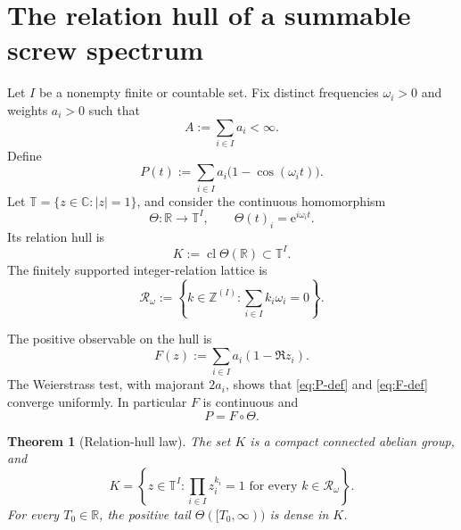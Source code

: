 \documentclass[11pt]{article}
\newtheorem{theorem}{Theorem}[section]
\theoremstyle{remark}
\newcommand{\T}{\mathbb T}
\newcommand{\R}{\mathbb R}
\newcommand{\Z}{\mathbb Z}
\newcommand{\e}{\mathrm e}
\newcommand{\cl}{\operatorname{cl}}
\newcommand{\Rel}{\mathcal R}
\begin{document}
\section{The relation hull of a summable screw spectrum}\label{sec:universal}

Let $I$ be a nonempty finite or countable set.  Fix distinct frequencies $\omega_i>0$ and weights
$a_i>0$ such that
\begin{equation}\label{eq:summable}
 A:=\sum_{i\in I}a_i<\infty.
\end{equation}
Define
\begin{equation}\label{eq:P-def}
 P(t):=\sum_{i\in I}a_i\bigl(1-\cos(\omega_i t)\bigr).
\end{equation}
Let $\T=\{z\in\mathbb C:|z|=1\}$, and consider the continuous homomorphism
\begin{equation}\label{eq:theta}
 \Theta:\R\longrightarrow\T^I,
 \qquad
 \Theta(t)_i=\e^{i\omega_i t}.
\end{equation}
Its relation hull is
\begin{equation}\label{eq:K-def}
 K:=\cl\Theta(\R)\subset\T^I.
\end{equation}
The finitely supported integer-relation lattice is
\begin{equation}\label{eq:relation-lattice}
 \Rel_\omega:=
 \left\{k\in\Z^{(I)}:\sum_{i\in I}k_i\omega_i=0\right\}.
\end{equation}

The positive observable on the hull is
\begin{equation}\label{eq:F-def}
 F(z):=\sum_{i\in I}a_i(1-\Re z_i).
\end{equation}
The Weierstrass test, with majorant $2a_i$, shows that \eqref{eq:P-def} and \eqref{eq:F-def}
converge uniformly.  In particular $F$ is continuous and
\begin{equation}\label{eq:P-factor}
 P=F\circ\Theta.
\end{equation}

\begin{theorem}[Relation-hull law]\label{thm:relation-hull}
The set $K$ is a compact connected abelian group, and
\begin{equation}\label{eq:annihilator-description}
 K=\left\{z\in\T^I:
       \prod_{i\in I}z_i^{k_i}=1\text{ for every }k\in\Rel_\omega\right\}.
\end{equation}
For every $T_0\in\R$, the positive tail $\Theta([T_0,\infty))$ is dense in $K$.
\end{theorem}
\end{document}
